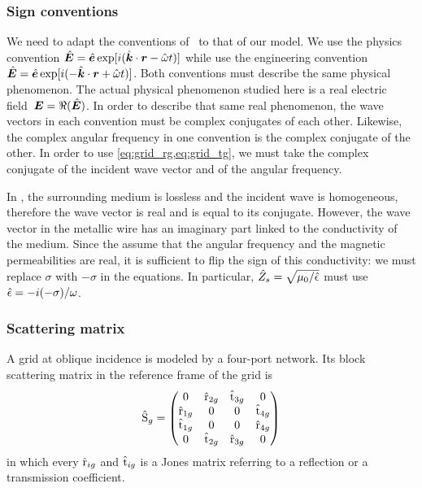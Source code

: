 \subsubsection{Sign conventions}
We need to adapt the conventions of~\textcite{houde_2001} to that of our model.
We use the physics convention
$\hat{\bm{E}}=\hat{\bm{e}} \exp[i(\hat{\bm{k}}\cdot \bm{r} - \hat{\omega}t)]$
while \citeauthor{houde_2001} use the engineering convention
$\hat{\bm{E}}=\hat{\bm{e}} \exp[i(-\hat{\bm{k}}\cdot \bm{r} + \hat{\omega}t)]$.
Both conventions must describe the same physical phenomenon.
The actual physical phenomenon studied here is a
real electric field~$\bm{E} = \Re(\hat{\bm{E}})$.
In order to describe that same real phenomenon, the wave vectors in each convention must be complex conjugates of each other.
Likewise, the complex angular frequency in one convention is the complex conjugate of the other.
In order to use \cref{eq:grid_rg,eq:grid_tg}, we must take the complex conjugate of the incident wave vector and of the angular frequency.

In \textcite{houde_2001}, the surrounding medium is lossless and the incident wave is homogeneous, therefore the wave vector is real and is equal to its conjugate.
However, the wave vector in the metallic wire has an imaginary part linked to the conductivity of the medium.
Since the \citeauthor{houde_2001} assume that the angular frequency and the magnetic permeabilities are real, it is sufficient to flip the sign of this conductivity: we must replace $\sigma$ with $-\sigma$ in the equations.
In particular, $\hat{Z}_s = \sqrt{\mu_0 / \hat{\epsilon}}$ must use
$\hat{\epsilon} = -i (-\sigma) / \omega$.

\subsubsection{Scattering matrix}
A grid at oblique incidence is modeled by a four-port network.
Its block scattering matrix in the reference frame of the grid is
\begin{equation}
    \hat{\mathrm{S}}_g
    =
    \begin{pmatrix}
        0               & \hat{\mathrm{r}}_{2g} & \hat{\mathrm{t}}_{3g} & 0               \\
        \hat{\mathrm{r}}_{1g} & 0               & 0               & \hat{\mathrm{t}}_{4g} \\
        \hat{\mathrm{t}}_{1g} & 0               & 0               & \hat{\mathrm{r}}_{4g} \\
        0               & \hat{\mathrm{t}}_{2g} & \hat{\mathrm{r}}_{3g} & 0
    \end{pmatrix}
    \label{eq:grid_scattering_local}
\end{equation}
in which every $\hat{\mathrm{r}}_{ig}$ and $\hat{\mathrm{t}}_{ig}$ is a Jones matrix referring to a reflection or a transmission coefficient.

